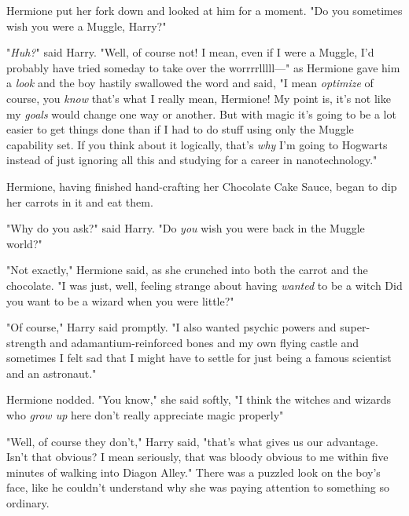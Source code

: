 Hermione put her fork down and looked at him for a moment. "Do you sometimes
wish you were a Muggle, Harry?"

"\emph{Huh?}" said Harry. "Well, of course not! I mean, even if I were a Muggle,
I'd probably have tried someday to take over the worrrrlllll\mbox{---}" as Hermione gave
him a \emph{look} and the boy hastily swallowed the word and said, "I mean
\emph{optimize} of course, you \emph{know} that's what I really mean, Hermione!
My point is, it's not like my \emph{goals} would change one way or another. But
with magic it's going to be a lot easier to get things done than if I had to do
stuff using only the Muggle capability set. If you think about it logically,
that's \emph{why} I'm going to Hogwarts instead of just ignoring all this and
studying for a career in nanotechnology."

Hermione, having finished hand-crafting her Chocolate Cake Sauce, began to dip
her carrots in it and eat them.

"Why do you ask?" said Harry. "Do \emph{you} wish you were back in the Muggle
world?"

"Not exactly," Hermione said, as she crunched into both the carrot and the
chocolate. "I was just, well, feeling strange about having \emph{wanted} to be
a witch{\el} Did you want to be a wizard when you were little?"

"Of course," Harry said promptly. "I also wanted psychic powers and
super-strength and adamantium-reinforced bones and my own flying castle and
sometimes I felt sad that I might have to settle for just being a famous
scientist and an astronaut."

Hermione nodded. "You know," she said softly, "I think the witches and wizards
who \emph{grow up} here don't really appreciate magic properly{\el}"

"Well, of course they don't," Harry said, "that's what gives us our advantage.
Isn't that obvious? I mean seriously, that was bloody obvious to me within five
minutes of walking into Diagon Alley." There was a puzzled look on the boy's
face, like he couldn't understand why she was paying attention to something so
ordinary.
